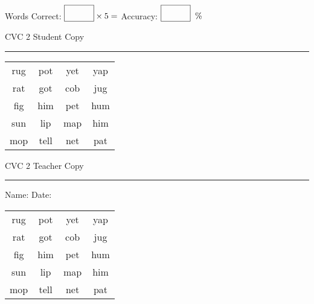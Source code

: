 \documentclass{memoir}
\begin{document}
\small

Words Correct: $\fbox{\phantom{\huge 100}} \times 5 = $ Accuracy: $\fbox{\phantom{\huge 100}}\;\; \%$ 

\vfill

\newpage


\footnotesize \noindent
CVC 2 \hfill Student Copy
\smallskip
\hrule

\Large

\setlength{\tabcolsep}{14pt}
\def\arraystretch{2}

{\selectfont


\begin{vplace}[0.5]
\begin{center}
\begin{tabular}{cccc}
rug & pot & yet & yap \\
rat & got & cob & jug \\
fig & him & pet & hum \\
sun & lip & map & him \\
mop & tell & net & pat \\
\end{tabular}
\end{center}
\end{vplace}

}

\newpage

\footnotesize \noindent
CVC 2 \hfill Teacher Copy
\smallskip
\hrule

\small

\vfill

\noindent
Name: \underline{\hspace{1.75in}} \hfill Date: \underline{\hspace{1in}}

\Large

{\selectfont


\begin{vplace}[0.5]
\begin{center}
\begin{tabular}{cccc}
rug & pot & yet & yap \\
rat & got & cob & jug \\
fig & him & pet & hum \\
sun & lip & map & him \\
mop & tell & net & pat \\
\end{tabular}
\end{center}
\end{vplace}



}
\end{document}
